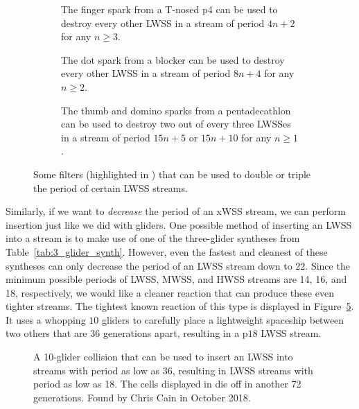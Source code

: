 \begin{figure}[!htb]
	\centering
	\begin{subfigure}{0.28\textwidth}
		\centering
		\caption{The finger spark from a T-nosed p4 can be used to destroy every other LWSS in a stream of period $4n+2$ for any $n \geq 3$.}\label{fig:lwss_filter_tnosed_p4}
	\end{subfigure} \hfill \begin{subfigure}{0.35\textwidth}
		\centering\vspace*{0cm}
		\caption{The dot spark from a blocker can be used to destroy every other LWSS in a stream of period $8n+4$ for any $n \geq 2$.}\label{fig:lwss_filter_blocker}
	\end{subfigure} \hfill \begin{subfigure}{0.335\textwidth}
		\centering
		\caption{The thumb and domino sparks from a pentadecathlon can be used to destroy two out of every three LWSSes in a stream of period $15n+5$ or $15n+10$ for any $n \geq 1$.}\label{fig:lwss_filter_pentadecathlon}
	\end{subfigure}
	\caption{Some filters (highlighted in ) that can be used to double or triple the period of certain LWSS streams.}\label{fig:lwss_filters}
\end{figure}

Similarly, if we want to \emph{decrease} the period of an xWSS stream, we can perform insertion just like we did with gliders. One possible method of inserting an LWSS into a stream is to make use of one of the three-glider syntheses from Table~\ref{tab:3_glider_synth}. However, even the fastest and cleanest of these syntheses can only decrease the period of an LWSS stream down to $22$. Since the minimum possible periods of LWSS, MWSS, and HWSS streams are 14, 16, and 18, respectively, we would like a cleaner reaction that can produce these even tighter streams. The tightest known reaction of this type is displayed in Figure~\ref{fig:lwss_insertion_p18}. It uses a whopping $10$ gliders to carefully place a lightweight spaceship between two others that are $36$ generations apart, resulting in a p$18$ LWSS stream.

\begin{figure}[!htb]
	\centering
	\caption{A 10-glider collision that can be used to insert an LWSS into streams with period as low as 36, resulting in LWSS streams with period as low as 18. The cells displayed in  die off in another 72 generations. Found by Chris Cain in October 2018.}\label{fig:lwss_insertion_p18}
\end{figure}

